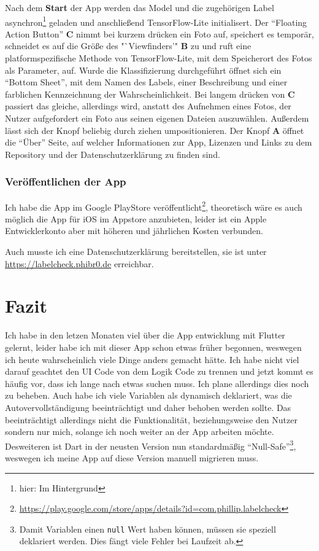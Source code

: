 Nach dem \textbf{Start} der App werden das Model und die zugehörigen Label asynchron\footnote{hier: Im Hintergrund} geladen und anschließend TensorFlow-Lite initialisert. Der "`Floating Action Button"' \textbf{C} nimmt bei kurzem drücken ein Foto auf, speichert es temporär, schneidet es auf die Größe des "`Viewfinders'" \textbf{B} zu und ruft eine platformspezifische Methode von TensorFlow-Lite, mit dem Speicherort des Fotos als Parameter, auf. Wurde die Klassifizierung durchgeführt öffnet sich ein "`Bottom Sheet"', mit dem Namen des Labels, einer Beschreibung und einer farblichen Kennzeichnung der Wahrscheinlichkeit. Bei langem drücken von \textbf{C} passiert das gleiche, allerdings wird, anstatt des Aufnehmen eines Fotos, der Nutzer aufgefordert ein Foto aus seinen eigenen Dateien auszuwählen. Außerdem lässt sich der Knopf beliebig durch ziehen umpositionieren. Der Knopf \textbf{A} öffnet die "`Über"' Seite, auf welcher Informationen zur App, Lizenzen und Links zu dem Repository und der Datenschutzerklärung zu finden sind.

\subsubsection{Veröffentlichen der App}

Ich habe die App im Google PlayStore veröffentlicht\footnote{\url{https://play.google.com/store/apps/details?id=com.phillip.labelcheck}}, theoretisch wäre es auch möglich die App für iOS im Appstore anzubieten, leider ist ein Apple Entwicklerkonto aber mit höheren und jährlichen Kosten verbunden.

Auch musste ich eine Datenschutzerklärung bereitstellen, sie ist unter \url{https://labelcheck.phibr0.de} erreichbar.

\section{Fazit}

Ich habe in den letzen Monaten viel über die App entwicklung mit Flutter gelernt, leider habe ich mit dieser App schon etwas früher begonnen, weswegen ich heute wahrscheinlich viele Dinge anders gemacht hätte. Ich habe nicht viel darauf geachtet den UI Code von dem Logik Code zu trennen und jetzt kommt es häufig vor, dass ich lange nach etwas suchen muss. Ich plane allerdings dies noch zu beheben. Auch habe ich viele Variablen als dynamisch deklariert, was die Autovervollständigung beeinträchtigt und daher behoben werden sollte. Das beeinträchtigt allerdings nicht die Funktionalität, beziehungsweise den Nutzer sondern nur mich, solange ich noch weiter an der App arbeiten möchte. Desweiteren ist Dart in der neusten Version nun standardmäßig "`Null-Safe"'\footnote{Damit Variablen einen \texttt{null} Wert haben können, müssen sie speziell deklariert werden. Dies fängt viele Fehler bei Laufzeit ab.}, weswegen ich meine App auf diese Version manuell migrieren muss.

